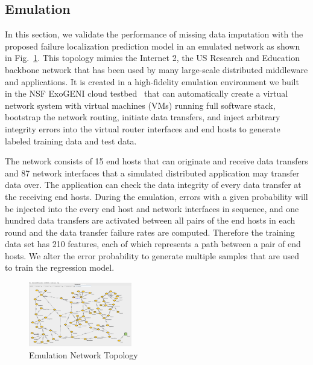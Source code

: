 \subsection{Emulation}
In this section, we validate the performance of missing data imputation with the proposed failure localization prediction 
model in an emulated network as shown in Fig.~\ref{fig:topology}. This topology mimics the Internet 2, the US Research 
and Education backbone network that has been used by many large-scale distributed middleware and applications.
It is created in a high-fidelity emulation environment we built in the NSF ExoGENI cloud testbed~\cite{iris:ictc21} 
that can automatically create a virtual network system with virtual machines (VMs) running full software stack, 
bootstrap the network routing, initiate data transfers, and inject arbitrary integrity errors into the virtual router interfaces 
and end hosts to generate labeled training data and test data.

The network consists of 15 end hosts that can originate and receive data transfers and 87 network interfaces that a simulated 
distributed application may transfer data over. The application can check the data integrity of every data transfer at the receiving end hosts.
During the emulation, errors with a given probability will be injected into the every end host and network interfaces in sequence, and one hundred 
data transfers are activated between all pairs of the end hosts in each round and the data transfer failure rates are computed. 
Therefore the training data set has 210 features, each of which represents a path between a pair of end hosts. We alter the error probability to generate 
multiple samples that are used to train the regression model.

\begin{figure}[!ht]
\begin{center}
\includegraphics[width=0.4\textwidth]{./figure/osg_pegasus_request.png}
\end{center}
\caption{Emulation Network Topology}
\label{fig:topology}
\end{figure}

